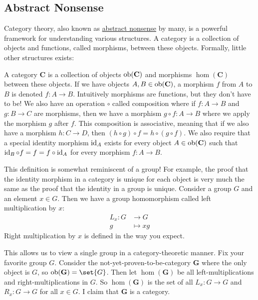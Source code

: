 \documentclass{article}
\begin{document}
\subsection*{Abstract Nonsense}

Category theory, also known as \href{https://en.wikipedia.org/wiki/Abstract_nonsense\#History}{abstract nonsense} by many, is a powerful framework for understanding various structures.
A category is a collection of objects and functions, called morphisms, between these objects.
Formally, little other structures exists:
\begin{defn}\label{defn:cat}
  A category $\textbf{C}$ is a collection of objects $\operatorname{ob}(\textbf{C})$ and morphisms $\hom(\textbf{C})$ between these objects.
  If we have objects $A, B \in \operatorname{ob}(\textbf{C})$, a morphism $f$ from $A$ to $B$ is denoted $f\colon A \to B$.
  Intuitively morphisms are functions, but they don't have to be!
  We also have an operation $\circ$ called composition where if $f\colon A \to B$ and $g\colon B \to C$ are morphisms, then we have a morphism $g \circ f\colon A \to B$ where we apply the morphism $g$ after $f$.
  This composition is associative, meaning that if we also have a morphism $h\colon C \to D$, then $(h \circ g) \circ f = h \circ (g \circ f)$.
  We also require that a special identity morphism $\operatorname{id}_{A}$ exists for every object $A \in \operatorname{ob}(\textbf{C})$ such that $\operatorname{id}_{B} \circ f = f = f \circ \operatorname{id}_{A}$ for every morphism $f\colon A \to B$.
\end{defn}

This definition is somewhat reminiscent of a group!
For example, the proof that the identity morphism in a category is unique for each object is very much the same as the proof that the identity in a group is unique.
Consider a group $G$ and an element $x \in G$.
Then we have a group homomorphism called left multiplication by $x$:
\begin{align*}
  L_{x}\colon G &\to G \\
              g &\mapsto xg
\end{align*}
Right multiplication by $x$ is defined in the way you expect.

This allows us to view a single group in a category-theoretic manner.
Fix your favorite group $G$.
Consider the not-yet-proven-to-be-category $\textbf{G}$ where the only object is $G$, so $\ob(\textbf{G}) = \set{G}$.
Then let $\hom(\textbf{G})$ be all left-multiplications and right-multiplications in $G$.
So $\hom(\textbf{G})$ is the set of all $L_{x}\colon G \to G$ and $R_{x}\colon G \to G$ for all $x \in G$.
I claim that $\textbf{G}$ is a category.
\end{document}

